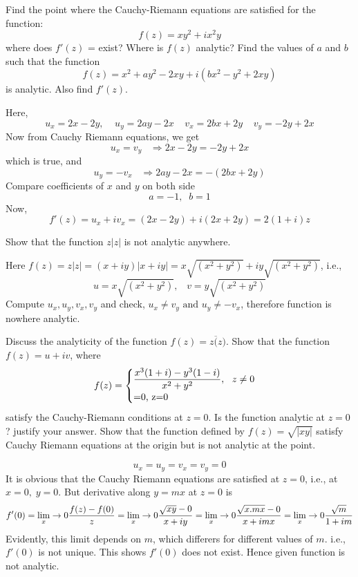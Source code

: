 \begin{problems}
\prob Find the point where the Cauchy-Riemann equations are satisfied for the function: 
\[f(z)=xy^2+ix^2y\]
where does $f'(z)$ = exist? Where is $f(z)$ analytic? 
\prob Find the values of $a$ and $b$ such that the function \[f(z)=x^2+ay^2-2xy+i(bx^2-y^2+2xy)\] is analytic. Also find $f'(z)$. 
\begin{sol}
Here,
\[u_x=2x-2y,\;\;\;\;u_y=2ay-2x\;\;\;\;v_x=2bx+2y\;\;\;\;v_y=-2y+2x\]
Now from Cauchy Riemann equations, we get
\[u_x=v_y\;\;\;\Rightarrow 2x-2y=-2y+2x\]
which is true, and
\[u_y=-v_x\;\;\;\Rightarrow 2ay-2x=-(2bx+2y)\]
Compare coefficients of $x$ and $y$ on both side
\[a=-1,\;\;b=1\]
Now,
\[f'(z)=u_x+iv_x = (2x-2y)+i(2x+2y) = 2(1+i)z\]
\end{sol}
\prob Show that the function $z|z|$ is not analytic anywhere. 
\begin{sol}
Here $f(z)=z|z| = (x+iy)|x+iy| = x\sqrt{(x^2+y^2)}+iy\sqrt{(x^2+y^2)}$, i.e.,
\[u=x\sqrt{(x^2+y^2)},\;\;\;v=y\sqrt{(x^2+y^2)}\]
Compute $u_x,u_y,v_x,v_y$ and check, $u_x\neq v_y \text{ and } u_y \neq -v_x$, therefore function is nowhere analytic.
\end{sol}
\prob Discuss the analyticity of the function $f(z)=z\overline(z)$.
\prob Show that the function $f(z)=u+iv$, where 
\[
f(z)=
\begin{cases} 
\ds \frac{x^3(1+i)-y^3(1-i)}{x^2+y^2},~~ z \neq 0 \\
$=0, z=0$ 
\end{cases}
\]
satisfy the Cauchy-Riemann conditions at $z=0$. Is the function analytic at $z=0$? justify your answer. 
\prob Show that the function defined by $f(z)=\sqrt{|xy|}$ satisfy Cauchy Riemann equations at the origin but is not analytic at the point. 
\begin{sol}
\[u_x=u_y=v_x=v_y =0\]
It is obvious that the Cauchy Riemann equations are satisfied at $z=0$, i.e., at $x=0,\;y=0$.
But derivative along $y=mx$ at $z=0$ is
\[f'(0)=\lim_x\rightarrow 0 \frac{f(z)-f(0)}{z}=\lim_x\rightarrow 0 \frac{\sqrt{xy}-0}{x+iy} = \lim_x\rightarrow 0 \frac{\sqrt{x.mx}-0}{x+imx} = \lim_x\rightarrow 0 \frac{\sqrt{m}}{1+im} \]
Evidently, this limit depends on $m$, which differers for different values of $m$. i.e., $f'(0)$ is not unique. This shows $f'(0)$ does not exist. Hence given function is not analytic.
\end{sol}
\end{problems}
